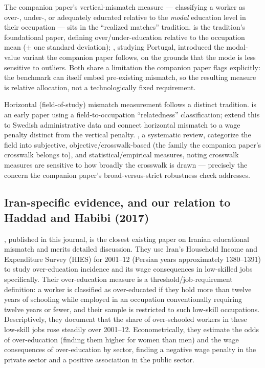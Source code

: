 \documentclass[11pt]{article}
\begin{document}
The companion paper's vertical-mismatch measure --- classifying a worker as over-, under-, or adequately educated relative to the \emph{modal} education level in their occupation --- sits in the ``realized matches'' tradition. \citet{verdugo1989} is the tradition's foundational paper, defining over/under-education relative to the occupation mean ($\pm$ one standard deviation); \citet{kiker1997}, studying Portugal, introduced the modal-value variant the companion paper follows, on the grounds that the mode is less sensitive to outliers. Both share a limitation the companion paper flags explicitly: the benchmark can itself embed pre-existing mismatch, so the resulting measure is relative allocation, not a technologically fixed requirement.

Horizontal (field-of-study) mismatch measurement follows a distinct tradition. \citet{robst2007} is an early paper using a field-to-occupation ``relatedness'' classification; \citet{nordin2010} extend this to Swedish administrative data and connect horizontal mismatch to a wage penalty distinct from the vertical penalty. \citet{somers2019}, a systematic review, categorize the field into subjective, objective/crosswalk-based (the family the companion paper's crosswalk belongs to), and statistical/empirical measures, noting crosswalk measures are sensitive to how broadly the crosswalk is drawn --- precisely the concern the companion paper's broad-versus-strict robustness check addresses.

\subsection{Iran-specific evidence, and our relation to Haddad and Habibi (2017)}
\label{sec:haddad}

\citet{haddad2017}, published in this journal, is the closest existing paper on Iranian educational mismatch and merits detailed discussion. They use Iran's Household Income and Expenditure Survey (HIES) for 2001--12 (Persian years approximately 1380--1391) to study over-education incidence and its wage consequences in low-skilled jobs specifically. Their over-education measure is a threshold/job-requirement definition: a worker is classified as over-educated if they hold more than twelve years of schooling while employed in an occupation conventionally requiring twelve years or fewer, and their sample is restricted to such low-skill occupations. Descriptively, they document that the share of over-schooled workers in these low-skill jobs rose steadily over 2001--12. Econometrically, they estimate the odds of over-education (finding them higher for women than men) and the wage consequences of over-education by sector, finding a negative wage penalty in the private sector and a positive association in the public sector.
\end{document}

